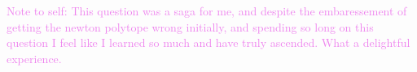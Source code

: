 \documentclass[12pt,letterpaper,boxed]{hmcpset}
\newcommand{\wg}[1]{\textcolor{violet}{#1}}
\begin{document}
\begin{solution}
\begin{itemize}
\wg{
Note to self: 
This question was a saga for me, and despite the embaressement of getting the newton
polytope wrong initially, and spending so long on this question
I feel like I learned so much and have truly
ascended. What a delightful experience.
}

\end{itemize}
\end{solution}

\newpage
\end{document}
